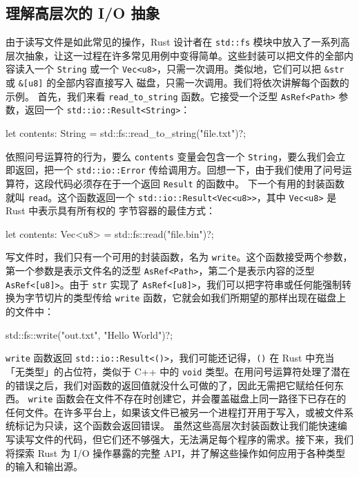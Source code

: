 \subsection{理解高层次的 I/\allowbreak{}O 抽象}
\label{idx:idx_69b1fc8d}
由于读写文件是如此常见的操作，Rust 设计者在 \texttt{std::fs} 模块中放入了一系列高层次抽象，让这一过程在许多常见用例中变得简单。这些封装可以把文件的全部内容读入一个 \texttt{String} 或一个
\texttt{Vec<u8>}，只需一次调用。类似地，它们可以把 \texttt{\&str} 或 \texttt{\&[u8]} 的全部内容直接写入
磁盘，只需一次调用。我们将依次讲解每个函数的示例。
\label{idx:idx_b02c6582}
首先，我们来看 \texttt{read\_\allowbreak{}to\_\allowbreak{}string} 函数。它接受一个泛型 \texttt{AsRef<Path>} 参数，返回一个 \texttt{std::\allowbreak{}io::\allowbreak{}Result<\allowbreak{}String>\allowbreak{}}：
\begin{codebox}[rust]
let contents: String = std::fs::read_to_string("file.txt")?;
\end{codebox}
依照问号运算符的行为，要么 \texttt{contents} 变量会包含一个 \texttt{String}，要么我们会立即返回，把一个 \texttt{std::\allowbreak{}io::\allowbreak{}Error} 传给调用方。回想一下，由于我们使用了问号运算符，这段代码必须存在于一个返回 \texttt{Result} 的函数中。
下一个有用的封装函数就叫 \texttt{read}。这个函数返回一个
\texttt{std::\allowbreak{}io::\allowbreak{}Result<\allowbreak{}Vec<\allowbreak{}u8>\allowbreak{}>\allowbreak{}}，其中 \texttt{Vec<u8>} 是 Rust 中表示具有所有权的
字节容器的最佳方式：
\begin{codebox}[rust]
let contents: Vec<u8> = std::fs::read("file.bin")?;
\end{codebox}
写文件时，我们只有一个可用的封装函数，名为 \texttt{write}。这个函数接受两个参数，第一个参数是表示文件名的泛型 \texttt{AsRef<Path>}，第二个是表示内容的泛型 \texttt{AsRef<[u8]>}。由于 \texttt{str} 实现了 \texttt{AsRef<[u8]>}，我们可以把字符串或任何能强制转换为字节切片的类型传给
\texttt{write} 函数，它就会如我们所期望的那样出现在磁盘上的文件中：
\begin{codebox}[rust]
std::fs::write("out.txt", "Hello World\n")?;
\end{codebox}
\texttt{write} 函数返回 \texttt{std::\allowbreak{}io::\allowbreak{}Result<\allowbreak{}(\allowbreak{})\allowbreak{}>\allowbreak{}}，我们可能还记得，\texttt{()} 在 Rust 中充当「无类型」的占位符，类似于 C++ 中的 \texttt{void} 类型。在用问号运算符处理了潜在的错误之后，我们对函数的返回值就没什么可做的了，因此无需把它赋给任何东西。
\label{idx:idx_bba0f367}
\texttt{write} 函数会在文件不存在时创建它，并会覆盖磁盘上同一路径下已存在的任何文件。在许多平台上，如果该文件已被另一个进程打开用于写入，或被文件系统标记为只读，这个函数会返回错误。
\label{idx:idx_b702221b}
虽然这些高层次封装函数让我们能快速编写读写文件的代码，但它们还不够强大，无法满足每个程序的需求。接下来，我们将探索 Rust 为 I/\allowbreak{}O 操作暴露的完整 API，并了解这些操作如何应用于各种类型的输入和输出源。
